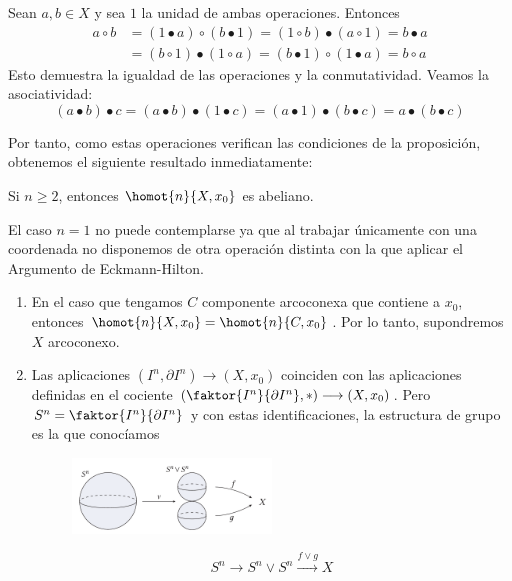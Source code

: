 \begin{demo}
Sean $a,b \in X$ y sea $1$ la unidad de ambas operaciones. Entonces
\begin{align*}
a \circ b &= (1 \bullet a) \circ (b \bullet 1) = (1 \circ b) \bullet (a \circ 1) = b \bullet a  \\
&= (b \circ 1) \bullet (1 \circ a) = (b \bullet 1) \circ (1 \bullet a) = b \circ a
\end{align*}
Esto demuestra la igualdad de las operaciones y la conmutatividad. Veamos la asociatividad:
\[
(a \bullet b) \bullet c = (a \bullet b) \bullet (1 \bullet c) = (a \bullet 1) \bullet (b \bullet c) = a \bullet (b \bullet c)
\]
\end{demo}
Por tanto, como estas operaciones verifican las condiciones de la proposición, obtenemos el siguiente resultado inmediatamente:
\begin{teor}
Si $n \geq 2$, entonces $\homot{n}{X, x_0}$ es abeliano.
\end{teor}
El caso $n=1$ no puede contemplarse ya que al trabajar únicamente con una coordenada no disponemos de otra operación distinta con la que aplicar el Argumento de Eckmann-Hilton.
\begin{custom}[Observaciones]
\begin{enumerate}
\item En el caso que tengamos $C$ componente arcoconexa que contiene a $x_0$, entonces $\homot{n}{X, x_0} = \homot{n}{C, x_0}$. Por lo tanto, supondremos $X$ arcoconexo.

\item Las aplicaciones $ (I^n, \partial I^n) \longrightarrow (X, x_0)$ coinciden con las aplicaciones definidas en el cociente $(\faktor{I^n}{\partial I^n}, \ast) \longrightarrow (X, x_0)$. Pero $S^n = \faktor{I^n}{\partial I^n}$ y con estas identificaciones, la estructura de grupo es la que conocíamos \par
\begin{figure}[h]
\centering
\includegraphics[width = 0.5\textwidth]{images/ejgruphomot}
\end{figure}
\[S^n \longrightarrow S^n \vee S^n \stackrel{f \vee g}{\longrightarrow} X \]
\end{enumerate}
\end{custom}
